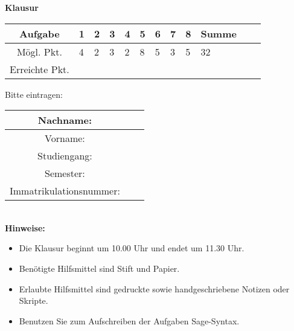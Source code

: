\begin{center}
\Huge \textbf{Klausur}
\end{center}
\bigskip\bigskip\bigskip
\Large
\begin{center}
\begin{tabular}{|Sl||p{0.5cm}|p{0.5cm}|p{0.5cm}|p{0.5cm}|p{0.5cm}|p{0.5cm}|p{0.5cm}|p{0.5cm}||Sc|}
\hline
Aufgabe & \textbf{1} & \textbf{2} & \textbf{3} & \textbf{4} & \textbf{5} & \textbf{6} & \textbf{7} & \textbf{8} & \textbf{Summe}\\
\hline
Mögl. Pkt. &  4  & 2  & 3  & 2  & 8  & 5  & 3  &  5  &  32  \\
\hline
Erreichte Pkt. &    &   &   &   &   &   &   &    &    \\
\hline
\end{tabular}
\end{center}

\bigskip\bigskip\bigskip
Bitte eintragen:\\
\begin{center}
\begin{tabular}{|Sl|p{8cm}|}
\hline
Nachname: & \\
\hline
Vorname: & \\
\hline
Studiengang: & \\
\hline 
Semester: & \\
\hline 
Immatrikulationsnummer: & \\
\hline
\end{tabular}\\[1cm]
\textbf{Hinweise:}
\begin{itemize}
\item Die Klausur beginnt um 10.00 Uhr und endet um 11.30 Uhr.
\item Ben\"otigte Hilfsmittel sind Stift und Papier.
\item Erlaubte Hilfsmittel sind gedruckte sowie handgeschriebene Notizen oder Skripte. 
\item Benutzen Sie zum Aufschreiben der Aufgaben Sage-Syntax.
\end{itemize}
\end{center}

\newpage
\normalsize
